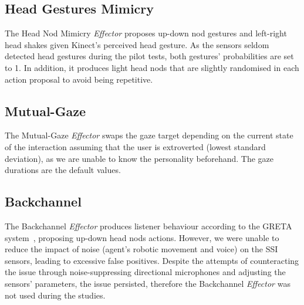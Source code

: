 
\subsection{Head Gestures Mimicry}

The Head Nod Mimicry \textit{Effector} proposes up-down nod gestures and left-right head shakes given Kinect's perceived head gesture. As the sensors seldom detected head gestures during the pilot tests, both gestures' probabilities are set to 1. In addition, it produces light head nods that are slightly randomised in each action proposal to avoid being repetitive.

\subsection{Mutual-Gaze}
The Mutual-Gaze \textit{Effector} swaps the gaze target depending on the current state of the interaction assuming that the user is extroverted (lowest standard deviation), as we are unable to know the personality beforehand. The gaze durations are the default values.

\subsection{Backchannel}
The Backchannel \textit{Effector} produces listener behaviour according to the GRETA system~\cite{Niewiadomski2009}, proposing up-down head nods actions.  However, we were unable to reduce the impact of noise (agent's robotic movement and voice) on the \ac{SSI} sensors, leading to excessive false positives. Despite the attempts of counteracting the issue through noise-suppressing directional microphones and adjusting the sensors' parameters, the issue persisted, therefore the Backchannel \textit{Effector} was not used during the studies.